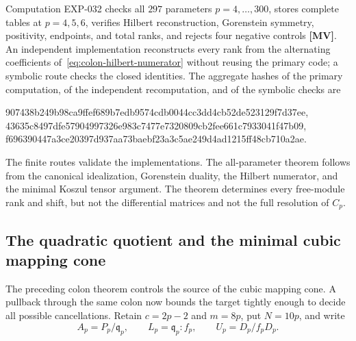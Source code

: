 \documentclass[11pt]{article}
\theoremstyle{definition}
\theoremstyle{remark}
\begin{document}
Computation EXP-032 checks all \(297\) parameters \(p=4,\ldots,300\), stores complete tables at
\(p=4,5,6\), verifies Hilbert reconstruction, Gorenstein symmetry, positivity, endpoints, and total
ranks, and rejects four negative controls \textbf{[MV]}. An independent implementation reconstructs
every rank from the alternating coefficients of~\eqref{eq:colon-hilbert-numerator} without reusing
the primary code; a symbolic route checks the closed identities. The aggregate hashes of the
primary computation, of the independent recomputation, and of the symbolic checks are
\begin{center}
{\fontsize{7}{8}\selectfont\ttfamily 907438b249b98ca9ffef689b7edb9574cdb0044cc3dd4cb52de523129f7d37ee},\\
{\fontsize{7}{8}\selectfont\ttfamily 43635c8497dfe57904997326e983c7477e7320809cb2fee661c7933041f47b09},\\
{\fontsize{7}{8}\selectfont\ttfamily f696390447a3ce20397d937aa73baebf23a3c5ae249d4ad1215ff48cb710a2ae}.
\end{center}
The finite routes validate the implementations. The all-parameter theorem follows from the
canonical idealization, Gorenstein duality, the Hilbert numerator, and the minimal Koszul tensor
argument. The theorem determines every free-module rank and shift, but not the differential
matrices and not the full resolution of \(C_p\).

\subsection{The quadratic quotient and the minimal cubic mapping cone}

The preceding colon theorem controls the source of the cubic mapping cone. A pullback through the
same colon now bounds the target tightly enough to decide all possible cancellations. Retain
\(c=2p-2\) and \(m=8p\), put \(N=10p\), and write
\[
A_p=P_p/\mathfrak q_p,\qquad
L_p=\mathfrak q_p:f_p,\qquad
U_p=D_p/f_pD_p.
\]
\end{document}

